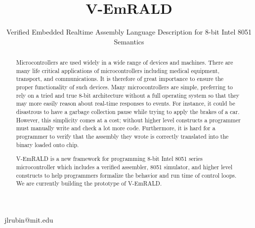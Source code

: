 \documentclass[preprint,11pt]{sigplanconf}
\begin{document}
\setlength{\pdfpageheight}{\paperheight}
\setlength{\pdfpagewidth}{\paperwidth}







\title{V-EmRALD}
\subtitle{Verified Embedded Realtime Assembly Language Description for
 8-bit Intel 8051 Semantics}

 {jlrubin@mit.edu}

\maketitle

\begin{abstract}
  Microcontrollers are used widely in a wide range of devices and
  machines.  There are many life critical applications of
  microcontrollers including medical equipment, transport, and
  communications. It is therefore of great importance to ensure the
  proper functionality of such devices. Many microcontrollers are
  simple, preferring to rely on a tried and true 8-bit architecture
  without a full operating system so that they may more easily reason
  about real-time responses to events. For instance, it could be
  disastrous to have a garbage collection pause while trying to apply
  the brakes of a car. However, this simplicity comes at a cost;
  without higher level constructs a programmer must manually write and
  check a lot more code. Furthermore, it is hard for a programmer to
  verify that the assembly they wrote is correctly translated into the
  binary loaded onto chip.


  V-EmRALD is a new framework for programming 8-bit Intel 8051 series
  microcontroller which includes a verified assembler, 8051 simulator, and
  higher level constructs to help programmers formalize the behavior
  and run time of control loops. We are currently building the
  prototype of V-EmRALD.
\end{abstract}
\end{document}
